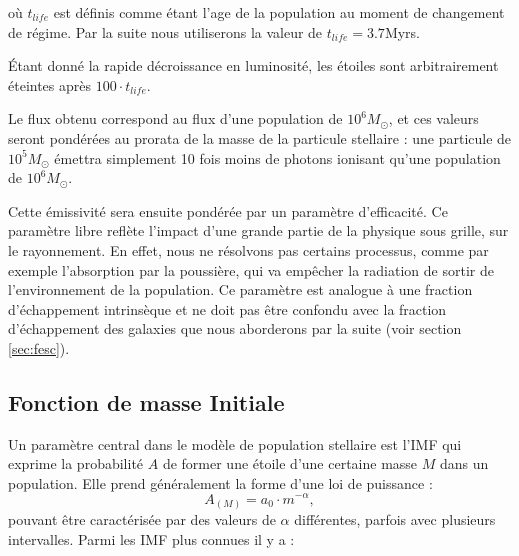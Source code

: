 où $t_{life}$ est définis comme étant l'age de la population au moment de changement de régime.
Par la suite nous utiliserons la valeur de $t_{life} = 3.7$Myrs.

Étant donné la rapide décroissance en luminosité, les étoiles sont arbitrairement éteintes après $100 \cdot t_{life}$.

Le flux obtenu correspond au flux d'une population de $10^6M_\odot$, et ces valeurs seront pondérées au prorata de la masse de la particule stellaire : une particule de $10^5M_\odot$ émettra  simplement 10 fois moins de photons ionisant qu'une population de $10^6 M_\odot$.

Cette émissivité sera ensuite pondérée par un paramètre d'efficacité.
Ce paramètre libre reflète l'impact d'une grande partie de la physique sous grille, sur le rayonnement.
En effet, nous ne résolvons pas certains processus, comme par exemple l'absorption par la poussière, qui va empêcher la radiation de sortir de l’environnement de la population.
Ce paramètre est analogue à une fraction d'échappement intrinsèque et ne doit pas être confondu avec la fraction d'échappement des galaxies que nous aborderons par la suite (voir section \ref{sec:fesc}).



\subsection{Fonction de masse Initiale}
\label{sec:imf}

Un paramètre central dans le modèle de population stellaire est l'\ac{IMF} qui exprime la probabilité $A$ de former une étoile d'une certaine masse $M$ dans un population.
Elle prend généralement la forme d'une loi de puissance :
\begin{equation}
A_{(M)} = a_0 \cdot m^{-\alpha},
\end{equation}
pouvant être caractérisée par des valeurs de $\alpha$ différentes, parfois avec plusieurs intervalles.
Parmi les \ac{IMF} plus connues il y a :

